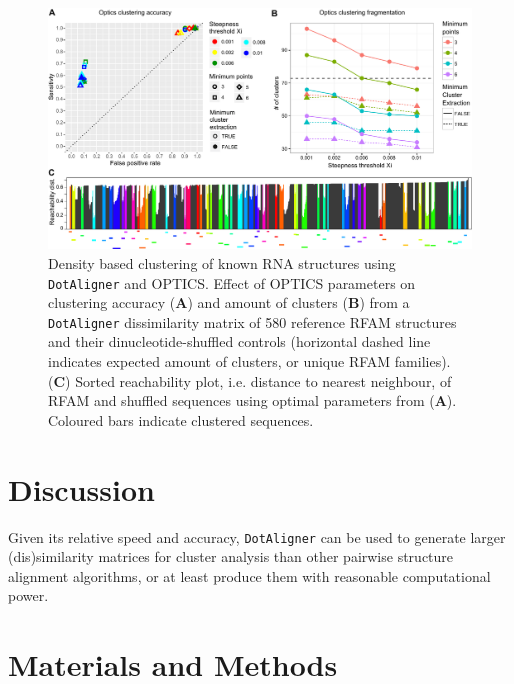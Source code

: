 \documentclass[a4paper,11pt]{article}
\newcommand\dotaligner{\texttt{DotAligner}}
\begin{document}
  \begin{figure}
 \includegraphics[width=\textwidth]{fig3}
 \caption { Density based clustering of known RNA structures using \dotaligner{} and OPTICS. Effect of OPTICS parameters on clustering accuracy (\textbf{A}) and amount of clusters (\textbf{B}) from a \dotaligner{} dissimilarity matrix of 580 reference RFAM structures and their dinucleotide-shuffled controls (horizontal dashed line indicates expected amount of clusters, or unique RFAM families). (\textbf{C}) Sorted reachability plot, i.e. distance to nearest neighbour, of RFAM and shuffled sequences using optimal parameters from (\textbf{A}). Coloured bars indicate clustered sequences. 
 }
\end{figure}

\section*{Discussion}
Given its relative speed and accuracy, \dotaligner{} can be used to generate larger 
(dis)similarity matrices for cluster analysis than other pairwise structure 
alignment algorithms, or at least produce them with reasonable computational 
power.  



\section{ Materials and Methods }
\end{document}
